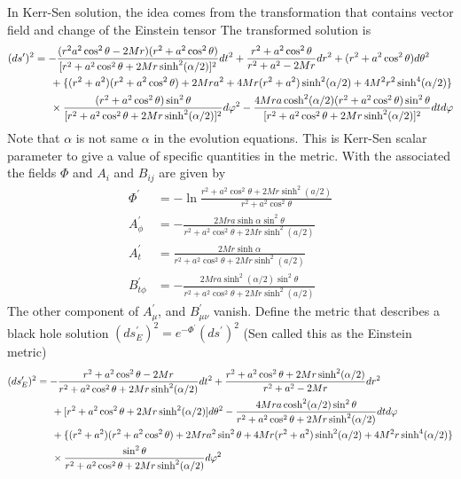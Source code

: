 \documentclass[prd]{revtex4}
\begin{document}
In Kerr-Sen solution, the idea comes from the transformation that contains vector field and change of the Einstein tensor The transformed solution is 
\begin{align}
(ds^\prime)^2 &= - \frac{(r^2 a^2 \cos^2 \theta -2 M r) (r^2 + a^2 \cos^2 \theta)}{[r^2 + a^2 \cos^2 \theta + 2 M r \sinh^2 (\alpha/2)]^2} dt^2 + \frac{r^2 + a^2 \cos^2 \theta}{r^2 + a^2 - 2 M r} d r^2 + (r^2 + a^2 \cos^2 \theta) d \theta^2 \nonumber \\
	&\indent + \{ (r^2 + a^2)(r^2 + a^2 \cos^2 \theta) + 2 M r a^2 + 4 M r (r^2 + a^2) \sinh^2 (\alpha/2) + 4 M^2 r^2 \sinh^4 (\alpha/2) \} \nonumber \\
	&\indent \times \frac{(r^2 + a^2 \cos^2 \theta) \sin^2 \theta}{[r^2 + a^2 \cos^2 \theta + 2 M r \sinh^2 (\alpha/2)]^2} d \varphi^2 - \frac{4 M r a \cosh^2 (\alpha/2) ( r^2 + a^2 \cos^2 \theta) \sin^2 \theta}{[r^2 + a^2 \cos^2 \theta + 2 M r \sinh^2 (\alpha/2)]^2} dt d \varphi
\end{align}
Note that $\alpha$ is not same $\alpha$ in the evolution equations. This is Kerr-Sen scalar parameter to give a value of specific quantities in the metric. With the associated the fields $\Phi$ and $A_i$ and $B_{ij}$ are given by
\begin{align}
\Phi^\prime &= - \ln \frac{ r^2 + a^2 \cos^2 \theta + 2 M r \sinh^2 (a/2)}{r^2 + a^2 \cos^2 \theta} \\
A^\prime_\phi &= - \frac{2 M r a \sinh \alpha \sin^2 \theta}{r^2 + a^2 \cos^2 \theta + 2 M r \sinh^2 (a/2) } \\
A^\prime_t &= \frac{2 M r  \sinh \alpha }{r^2 + a^2 \cos^2 \theta + 2 M r \sinh^2 (a/2) } \\
B^\prime_{t \phi} &= - \frac{2 M r a \sinh^2 (\alpha/2) \sin^2 \theta}{r^2 + a^2 \cos^2 \theta + 2 M r \sinh^2 (a/2) }
\end{align}
The other component of $A^\prime_\mu$, and $B^\prime_{\mu \nu}$ vanish. Define the metric that describes a black hole solution $(d s^\prime_E)^2 = e^{- \Phi^\prime} (d s^\prime)^2$ (Sen called this as the Einstein metric)
\begin{align}
(d s^\prime_E)^2  &= -\frac{r^2 + a^2 \cos^2 \theta - 2 M r}{r^2 + a^2 \cos^2 \theta + 2 M r \sinh^2 (\alpha/2)} dt^2 + \frac{r^2 + a^2 \cos^2 \theta + 2 M r \sinh^2 (\alpha/2)}{r^2 + a^2 - 2 M r} d r^2 \nonumber \\
			   &\indent + [ r^2 + a^2 \cos^2 \theta + 2 M r \sinh^2 (\alpha/2)]d \theta^2 - \frac{4 M r a \cosh^2 (\alpha/2) \sin^2 \theta}{r^2 + a^2 \cos^2 \theta + 2 M r \sinh^2 (\alpha/2)} dt d\varphi \nonumber \\
			   &\indent + \{ (r^2 + a^2)(r^2 + a^2 \cos^2 \theta) + 2 M r a^2 \sin^2 \theta + 4 M r (r^2 + a^2)\sinh^2 (\alpha/2) + 4 M^2 r \sinh^4 (\alpha/2) \} \nonumber \\
			   &\indent \times \frac{ \sin^2 \theta}{r^2 + a^2 \cos^2 \theta + 2 M r \sinh^2 (\alpha/2)} d \varphi^2
\end{align}
\end{document}
